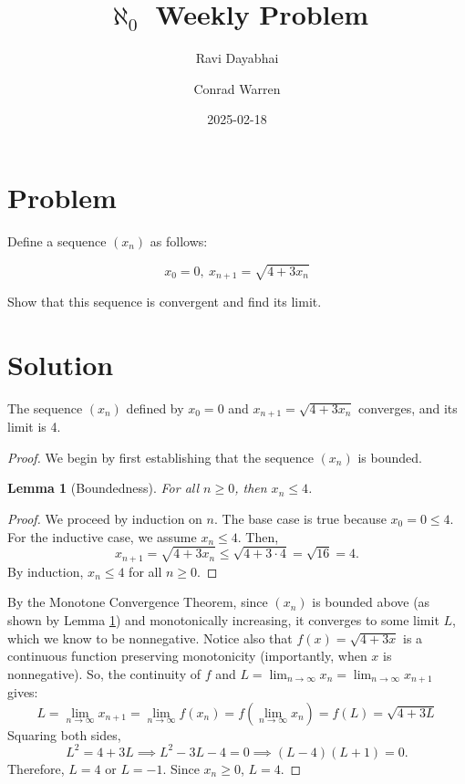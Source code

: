 \documentclass{article}
\title{$\aleph_{0}$ Weekly Problem}
\author{Ravi Dayabhai \and Conrad Warren}
\date{2025-02-18}
\newcommand{\claimname}{}
\newenvironment{claim}[1]
 {\renewcommand{\claimname}{#1}\claiminner}
 {\endclaiminner}
\newtheorem{lemma}{Lemma}
\newenvironment{lemmaproof}
  {\renewcommand{\qedsymbol}{$\blacksquare$}\begin{proof}}
  {\end{proof}}
\begin{document}
\maketitle

\section*{Problem}

Define a sequence $\left( x_{n} \right)$ as follows:

\[
    x_{0} = 0,\ x_{n+1} = \sqrt{4 + 3x_{n}}
\]

\noindent
Show that this sequence is convergent and find its limit.

\section*{Solution}

\begin{claim}{Claim}
    The sequence \(\left( x_n \right)\) defined by \(x_0 = 0\) and \(x_{n+1} = \sqrt{4 + 3x_n}\) converges, and its limit is 4.
\end{claim}

\begin{proof}

  We begin by first establishing that the sequence \(\left( x_n \right)\) is bounded.

    \begin{lemma}[Boundedness]
    \label{bounded-lemma}
      For all \(n \geq 0\), then \(x_n \leq 4\).
    \end{lemma}

    \begin{lemmaproof}

      We proceed by induction on $n$. The base case is true because \(x_{0} = 0 \leq 4\). 
      For the inductive case, we assume \(x_n \leq 4\). Then,
    \[
    x_{n+1} = \sqrt{4 + 3x_n} \leq \sqrt{4 + 3 \cdot 4} = \sqrt{16} = 4.
    \]
    By induction, \(x_n \leq 4\) for all \(n \geq 0\).

    \end{lemmaproof}

  By the Monotone Convergence Theorem, since \(\left( x_n \right)\) is bounded above (as shown by Lemma \ref{bounded-lemma}) and monotonically increasing, it converges to some limit \(L\), which we know to be nonnegative.
  Notice also that $f(x) = \sqrt{4 + 3x}$ is a continuous function preserving monotonicity (importantly, when $x$ is nonnegative). So, the continuity of $f$ and  $L = \lim_{n \to \infty} x_n = \lim_{n \to \infty} x_{n+1}$ gives: 
      \[
        L = \lim_{n \to \infty} x_{n+1} = \lim_{n \to \infty} f(x_{n}) = f\left(\lim_{n \to \infty} x_{n} \right) = f(L) = \sqrt{4 + 3L}
      \]
Squaring both sides,
\[
L^2 = 4 + 3L \implies L^2 - 3L - 4 = 0 \implies (L - 4)(L + 1) = 0.
\]
Therefore, \(L = 4\) or \(L = -1\). Since \(x_n \geq 0\), \(L = 4\).
\end{proof}
\end{document}
